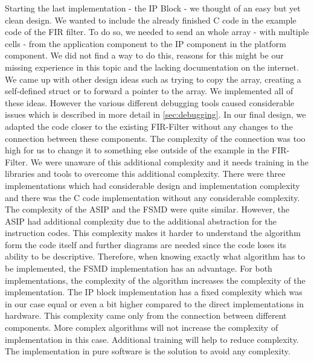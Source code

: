 \documentclass[conference]{IEEEtran}
\begin{document}
Starting the last implementation - the IP Block - we thought of an easy but yet clean design. We wanted to include the already finished C code in the example code of the FIR filter. To do so, we needed to send an whole array - with multiple cells - from the application component to the IP component in the platform component. We did not find a way to do this, reasons for this might be our missing experience in this topic and the lacking documentation on the internet. We came up with other design ideas such as trying to copy the array, creating a self-defined struct or to forward a pointer to the array. We implemented all of these ideas. However the various different debugging tools caused considerable issues which is described in more detail in \ref*{sec:debugging}. In our final design, we adapted the code closer to the existing FIR-Filter without any changes to the connection between these components. The complexity of the connection was too high for us to change it to something else outside of the example in the FIR-Filter. We were unaware of this additional complexity and it needs training in the libraries and tools to overcome this additional complexity.
There were three implementations which had considerable design and implementation complexity and there was the C code implementation without any considerable complexity. The complexity of the ASIP and the FSMD were quite similar. However, the ASIP had additional complexity due to the additional abstraction for the instruction codes. This complexity makes it harder to understand the algorithm form the code itself and further diagrams are needed since the code loses its ability to be descriptive. Therefore, when knowing exactly what algorithm has to be implemented, the FSMD implementation has an advantage. For both implementations, the complexity of the algorithm increases the complexity of the implementation. The IP block implementation has a fixed complexity which was in our case equal or even a bit higher compared to the direct implementations in hardware. This complexity came only from the connection between different components. More complex algorithms will not increase the complexity of implementation in this case. Additional training will help to reduce complexity.\\
The implementation in pure software is the solution to avoid any complexity.\\
\end{document}
